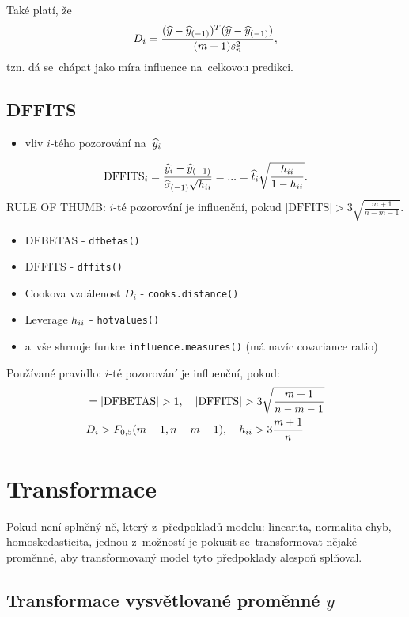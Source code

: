 \begin{remark}
	Také platí, že
	 $$ D_i = \frac{(\widehat{y}-{\widehat{y}_{(-1)}})^T(\widehat{y}-{\widehat{y}_{(-1)}})}{(m+1)s_n^2}, $$
	tzn. dá se~chápat jako míra influence na~celkovou predikci.
\end{remark}

\subsection*{DFFITS}
\begin{itemize}
	\item vliv $i$-tého pozorování na~$\widehat{y}_i$
\end{itemize}
 $$ \mathrm{DFFITS}_i = \frac{\widehat{y}_i-{\widehat{y}_{(-1)}}}{{\widehat{{\sigma}}_{(-1)}}\sqrt{h_{ii}}} = ... = \widehat{t}_i\sqrt{\frac{h_{ii}}{1-h_{ii}}}. $$
RULE OF THUMB: $i$-té pozorování je influenční, pokud $|\mathrm{DFFITS}|>3\sqrt{\frac{m+1}{n-m-1}}$.

\begin{remark}
\begin{itemize}
	\item DFBETAS - \verb|dfbetas()|
	\item DFFITS - \verb|dffits()|
	\item Cookova vzdálenost $D_i$ - \verb|cooks.distance()|
	\item Leverage $h_{ii}$ - \verb|hotvalues()|
	\item a~vše shrnuje funkce \verb|influence.measures()| (má navíc covariance ratio)
\end{itemize}

Používané pravidlo: $i$-té pozorování je influenční, pokud:
\begin{align*}
	& = | \mathrm{DFBETAS} | > 1, \quad |\mathrm{DFFITS}| > 3 \sqrt{\frac{m+1}{n-m-1}} \\
	& D_i > F_{0,5}(m+1,n-m-1), \quad h_{ii} > 3 \frac{m+1}{n}
\end{align*}
\end{remark}

\section{Transformace}

Pokud není splněný ně, který z~předpokladů modelu: linearita, normalita chyb, homoskedasticita, jednou z~možností je pokusit se~transformovat nějaké proměnné, aby transformovaný model tyto předpoklady alespoň  splňoval.

\subsection{Transformace vysvětlované proměnné $y$ }

